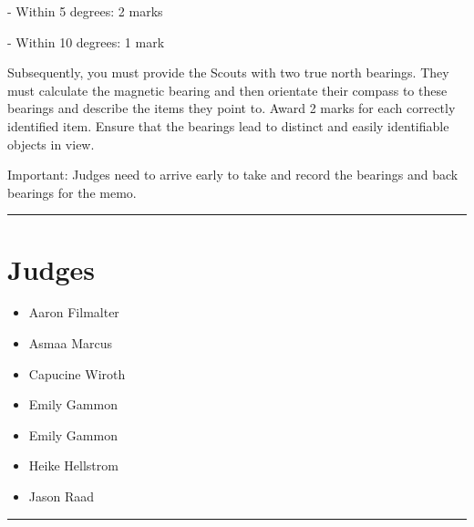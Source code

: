 \documentclass[10pt]{article}
\begin{document}
- Within 5 degrees: 2 marks

- Within 10 degrees: 1 mark



Subsequently, you must provide the Scouts with two true north bearings. They must calculate the magnetic bearing and then orientate their compass to these bearings and describe the items they point to. Award 2 marks for each correctly identified item. Ensure that the bearings lead to distinct and easily identifiable objects in view.



Important: Judges need to arrive early to take and record the bearings and back bearings for the memo. 
\vspace{0.5cm}
	\hrule
	\vspace{0.5cm}
		\section*{\faUsers \: Judges}

		

	\begin{multicols}{2}

		\begin{itemize}
									\item Aaron Filmalter
									\item Asmaa Marcus
									\item Capucine Wiroth
									\item Emily Gammon
						\end{itemize}

		\vfill\null
		\columnbreak

		\begin{itemize}
									\item Emily Gammon
									\item Heike Hellstrom
									\item Jason Raad
						\end{itemize}

		\vfill\null

		\end{multicols}



			\vspace{0.5cm}
	\hrule
	\vspace{0.5cm}
\end{document}
